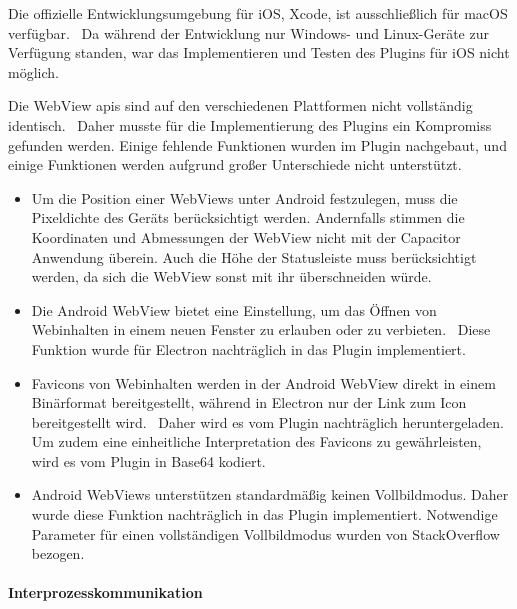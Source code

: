 \begin{note}
    Die offizielle Entwicklungsumgebung für iOS, Xcode, ist ausschließlich für macOS verfügbar.~\cite{xcode:support}
    Da während der Entwicklung nur Windows- und Linux-Geräte zur Verfügung standen, war das Implementieren und Testen des Plugins für iOS nicht möglich.
\end{note}

Die WebView \acsp{api} sind auf den verschiedenen Plattformen nicht vollständig identisch.~\cite{android:api, electron}
Daher musste für die Implementierung des Plugins ein Kompromiss gefunden werden. Einige fehlende Funktionen wurden im Plugin nachgebaut, und einige Funktionen werden aufgrund großer Unterschiede nicht unterstützt.

\begin{itemize}
    \setlength\itemsep{-0.5em}
    \item Um die Position einer WebViews unter Android festzulegen, muss die Pixeldichte des Geräts berücksichtigt werden. Andernfalls stimmen die Koordinaten und Abmessungen der WebView nicht mit der Capacitor Anwendung überein. Auch die Höhe der Statusleiste muss berücksichtigt werden, da sich die WebView sonst mit ihr überschneiden würde.
    \item Die Android WebView bietet eine Einstellung, um das Öffnen von Webinhalten in einem neuen Fenster zu erlauben oder zu verbieten.~\cite{android:api} Diese Funktion wurde für Electron nachträglich in das Plugin implementiert.
    \item Favicons von Webinhalten werden in der Android WebView direkt in einem Binärformat bereitgestellt, während in Electron nur der Link zum Icon bereitgestellt wird.~\cite{android:api, electron} Daher wird es vom Plugin nachträglich heruntergeladen. Um zudem eine einheitliche Interpretation des Favicons zu gewährleisten, wird es vom Plugin in Base64 kodiert.
    \item Android WebViews unterstützen standardmäßig keinen Vollbildmodus. Daher wurde diese Funktion nachträglich in das Plugin implementiert. Notwendige Parameter für einen vollständigen Vollbildmodus wurden von StackOverflow bezogen. \cite{android:api, stackoverflow}
\end{itemize}

\newpage

\paragraph{Interprozesskommunikation}

